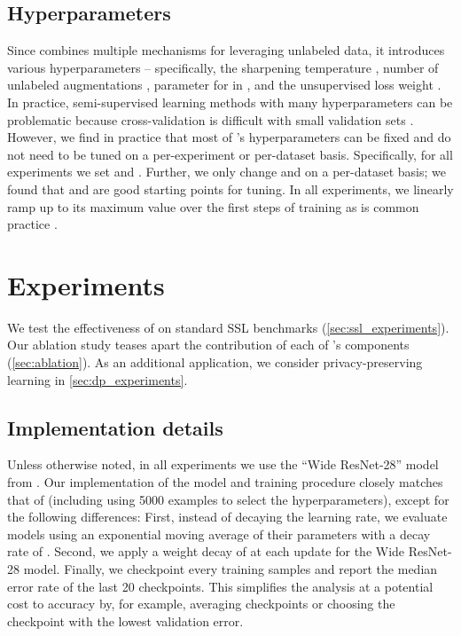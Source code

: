 \documentclass{article}
\begin{document}
\subsection{Hyperparameters}

Since  combines multiple mechanisms for leveraging unlabeled data, it introduces various hyperparameters -- specifically, the sharpening temperature , number of unlabeled augmentations ,  parameter for  in , and the unsupervised loss weight .
In practice, semi-supervised learning methods with many hyperparameters can be problematic because cross-validation is difficult with small validation sets \cite{oliver2018realistic,rasmus2015semi,oliver2018realistic}.
However, we find in practice that most of 's hyperparameters can be fixed and do not need to be tuned on a per-experiment or per-dataset basis.
Specifically, for all experiments we set  and .
Further, we only change  and  on a per-dataset basis; we found that  and  are good starting points for tuning.
In all experiments, we linearly ramp up  to its maximum value over the first  steps of training as is common practice \cite{tarvainen2017weight}.

\section{Experiments}
We test the effectiveness of  on standard SSL benchmarks (\cref{sec:ssl_experiments}). Our  ablation study teases apart the contribution of each of 's components (\cref{sec:ablation}).
As an additional application, we consider privacy-preserving learning in \cref{sec:dp_experiments}.


\subsection{Implementation details}
\label{sec:implementation}

Unless otherwise noted, in all experiments we use the ``Wide ResNet-28'' model from \cite{oliver2018realistic}.
Our implementation of the model and training procedure closely matches that of \cite{oliver2018realistic} (including using 5000 examples to select the hyperparameters), except for the following differences:
First, instead of decaying the learning rate, we evaluate models using an exponential moving average of their parameters with a decay rate of .
Second, we apply a weight decay of  at each update for the Wide ResNet-28 model.
Finally, we checkpoint every  training samples and report the median error rate of the last 20 checkpoints.
This simplifies the analysis at a potential cost to accuracy by,
for example, averaging checkpoints \cite{athiwaratkun2018improving} or choosing the checkpoint with the lowest validation error.
\end{document}
